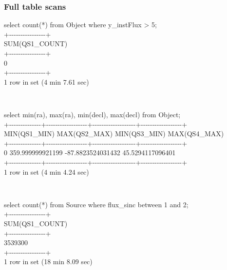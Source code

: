 \subsubsection{Full table scans}\label{full-table-scans}

select count(*) from Object where y\_instFlux \textgreater{} 5;\\
+-\/-\/-\/-\/-\/-\/-\/-\/-\/-\/-\/-\/-\/-\/-\/-+\\
\textbar{} SUM(QS1\_COUNT) \textbar{}\\
+-\/-\/-\/-\/-\/-\/-\/-\/-\/-\/-\/-\/-\/-\/-\/-+\\
\textbar{} 0 \textbar{}\\
+-\/-\/-\/-\/-\/-\/-\/-\/-\/-\/-\/-\/-\/-\/-\/-+\\
1 row in set (4 min 7.61 sec)

~

select min(ra), max(ra), min(decl), max(decl) from Object;\\
+-\/-\/-\/-\/-\/-\/-\/-\/-\/-\/-\/-\/-\/-+-\/-\/-\/-\/-\/-\/-\/-\/-\/-\/-\/-\/-\/-\/-\/-\/-\/-+-\/-\/-\/-\/-\/-\/-\/-\/-\/-\/-\/-\/-\/-\/-\/-\/-\/-\/-+-\/-\/-\/-\/-\/-\/-\/-\/-\/-\/-\/-\/-\/-\/-\/-\/-\/-+\\
\textbar{} MIN(QS1\_MIN) \textbar{} MAX(QS2\_MAX) \textbar{}
MIN(QS3\_MIN) \textbar{} MAX(QS4\_MAX) \textbar{}\\
+-\/-\/-\/-\/-\/-\/-\/-\/-\/-\/-\/-\/-\/-+-\/-\/-\/-\/-\/-\/-\/-\/-\/-\/-\/-\/-\/-\/-\/-\/-\/-+-\/-\/-\/-\/-\/-\/-\/-\/-\/-\/-\/-\/-\/-\/-\/-\/-\/-\/-+-\/-\/-\/-\/-\/-\/-\/-\/-\/-\/-\/-\/-\/-\/-\/-\/-\/-+\\
\textbar{} 0 \textbar{} 359.999999921199 \textbar{} -87.8823524031432
\textbar{} 45.5294117096401 \textbar{}\\
+-\/-\/-\/-\/-\/-\/-\/-\/-\/-\/-\/-\/-\/-+-\/-\/-\/-\/-\/-\/-\/-\/-\/-\/-\/-\/-\/-\/-\/-\/-\/-+-\/-\/-\/-\/-\/-\/-\/-\/-\/-\/-\/-\/-\/-\/-\/-\/-\/-\/-+-\/-\/-\/-\/-\/-\/-\/-\/-\/-\/-\/-\/-\/-\/-\/-\/-\/-+\\
1 row in set (4 min 4.24 sec)

~

select count(*) from Source where flux\_sinc between 1 and 2;\\
+-\/-\/-\/-\/-\/-\/-\/-\/-\/-\/-\/-\/-\/-\/-\/-+\\
\textbar{} SUM(QS1\_COUNT) \textbar{}\\
+-\/-\/-\/-\/-\/-\/-\/-\/-\/-\/-\/-\/-\/-\/-\/-+\\
\textbar{} 3539300 \textbar{}\\
+-\/-\/-\/-\/-\/-\/-\/-\/-\/-\/-\/-\/-\/-\/-\/-+\\
1 row in set (18 min 8.09 sec)

